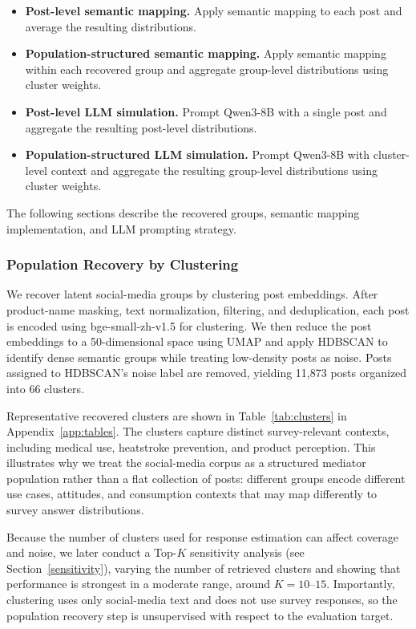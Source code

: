 \documentclass{article}
\begin{document}
\begin{itemize}
    \item \textbf{Post-level semantic mapping.}
    Apply semantic mapping to each post and average the resulting distributions.

    \item \textbf{Population-structured semantic mapping.}
    Apply semantic mapping within each recovered group and aggregate group-level distributions using cluster weights.

    \item \textbf{Post-level LLM simulation.}
    Prompt Qwen3-8B with a single post and aggregate the resulting post-level distributions.

    \item \textbf{Population-structured LLM simulation.}
    Prompt Qwen3-8B with cluster-level context and aggregate the resulting group-level distributions using cluster weights.
\end{itemize}

The following sections describe the recovered groups, semantic mapping implementation, and LLM prompting strategy.

\subsubsection{Population Recovery by Clustering}
\label{cluster_sec}

We recover latent social-media groups by clustering post embeddings.
After product-name masking, text normalization, filtering, and deduplication, each post is encoded using bge-small-zh-v1.5 \cite{bge_small_zh_v15} for clustering.
We then reduce the post embeddings to a 50-dimensional space using UMAP and apply HDBSCAN to identify dense semantic groups while treating low-density posts as noise.
Posts assigned to HDBSCAN's noise label are removed, yielding 11,873 posts organized into 66 clusters.

Representative recovered clusters are shown in Table~\ref{tab:clusters} in Appendix~\ref{app:tables}. The clusters capture distinct survey-relevant contexts, including medical use, heatstroke prevention, and product perception. This illustrates why we treat the social-media corpus as a structured mediator population rather than a flat collection of posts: different groups encode different use cases, attitudes, and consumption contexts that may map differently to survey answer distributions.

Because the number of clusters used for response estimation can affect coverage and noise, we later conduct a Top-$K$ sensitivity analysis (see Section~\ref{sensitivity}), varying the number of retrieved clusters and showing that performance is strongest in a moderate range, around $K=10$--$15$.
Importantly, clustering uses only social-media text and does not use survey responses, so the population recovery step is unsupervised with respect to the evaluation target.
\end{document}
